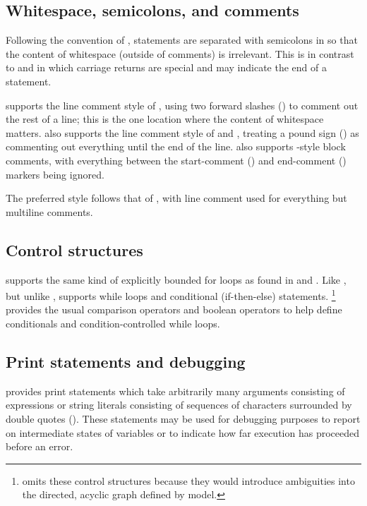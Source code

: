 \documentclass[article]{jss}
\begin{document}
\subsection{Whitespace, semicolons, and comments}

Following the convention of , statements are separated
with semicolons in  so that the content of whitespace
(outside of comments) is irrelevant.  This is in contrast to
 and  in which carriage returns are
special and may indicate the end of a statement.

 supports the line comment style of ,
using two forward slashes (\code{//}) to comment out the rest of a
line; this is the one location where the content of whitespace
matters.   also supports the line comment style of  and
, treating a pound sign (\code{\#}) as commenting out
everything until the end of the line.   also supports
-style block comments, with everything between the
start-comment (\code{/*}) and end-comment (\code{*/}) markers being
ignored. 

The preferred style follows that of , with line comment
used for everything but multiline comments.

\subsection{Control structures}

 supports the same kind of explicitly bounded for loops
as found in  and .  Like , but unlike
,  supports while loops and conditional
(if-then-else) statements.%
%
\footnote{ omits these control structures because they
  would introduce ambiguities into the directed, acyclic graph defined
  by model.}
%
 provides the usual comparison operators and boolean
operators to help define conditionals and condition-controlled while
loops.  

\subsection{Print statements and debugging}

 provides print statements which take arbitrarily many
arguments consisting of expressions or string literals consisting of
sequences of characters surrounded by double quotes ().
These statements may be used for debugging purposes to report on
intermediate states of variables or to indicate how far execution has
proceeded before an error.
\end{document}
